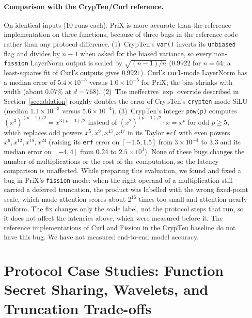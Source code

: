 \documentclass[11pt]{article}
\begin{document}
\paragraph{Comparison with the CrypTen/Curl reference.} On identical inputs (10 runs each), PriX is more accurate than the reference implementation on three functions, because of three bugs in the reference code rather than any protocol difference. (1)~CrypTen's \texttt{var()} inverts its \texttt{unbiased} flag and divides by $n - 1$ when asked for the biased variance, so every non-\texttt{fission} LayerNorm output is scaled by $\sqrt{(n-1)/n}$ ($0.9922$ for $n = 64$; a least-squares fit of Curl's outputs gives $0.9921$). Curl's \texttt{curl}-mode LayerNorm has a median error of $5.4 \times 10^{-3}$ versus $1.0 \times 10^{-5}$ for PriX; the bias shrinks with width (about $0.07\%$ at $d = 768$). (2)~The ineffective $\exp$ override described in Section~\ref{sec:ablation} roughly doubles the error of CrypTen's \texttt{crypten}-mode SiLU (median $1.1 \times 10^{-3}$ versus $5.6 \times 10^{-4}$). (3)~CrypTen's integer \texttt{pow(p)} computes $(x^3)^{(p-1)/2} = x^{3(p-1)/2}$ instead of $(x^2)^{(p-1)/2} \cdot x = x^p$ for odd $p \ge 5$, which replaces odd powers $x^5, x^9, x^{13}, x^{17}$ in its Taylor \texttt{erf} with even powers $x^6, x^{12}, x^{18}, x^{24}$ (raising its \texttt{erf} error on $[-1.5, 1.5]$ from $3 \times 10^{-4}$ to $3.3$ and its median error on $[-4, 4]$ from $0.24$ to $2.5 \times 10^3$). None of these bugs changes the number of multiplications or the cost of the computation, so the latency comparison is unaffected.
While preparing this evaluation, we found and fixed a bug in PriX's \texttt{fission} mode: when the right operand of a multiplication still carried a deferred truncation, the product was labelled with the wrong fixed-point scale, which made attention scores about $2^{16}$ times too small and attention nearly uniform. The fix changes only the scale label, not the protocol steps that run, so it does not affect the latencies above, which were measured before it. The reference implementations of Curl and Fission in the CrypTen baseline do not have this bug. We have not measured end-to-end model accuracy.

\section{Protocol Case Studies: Function Secret Sharing, Wavelets, and Truncation Trade-offs}
\label{sec:fss_wave_discussion}
\end{document}
